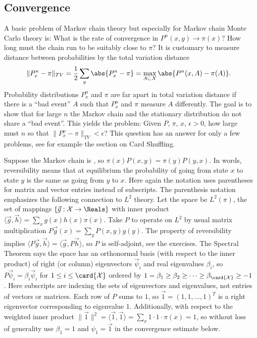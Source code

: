 \documentclass[12pt]{article}
\begin{document}
\subsection*{Convergence} A basic problem of Markov chain theory but
especially for Markov chain Monte Carlo theory is:  What is the rate of
convergence in \( P^n(x,y) \to \pi(x) \)?  How long must the chain run
to be suitably close to \( \pi \)?  It is customary to measure distance
between probabilities by the total variation distance
\[
    \|P^n_x - \pi\|_{TV} = \frac{1}{2} \sum\limits_y \abs{ P^n_x - \pi }
    = \max_{A\subset X} \abs{ P^n(x,A) - \pi(A) }.
\] Probability distributions \( P^n_{x} \) and \( \pi \) are far apart
in total variation distance if there is a ``bad event'' \( A \) such
that \( P^n_{x} \) and \( \pi \) measure \( A \) differently.  The goal
is to show that for large \( n \) the Markov chain and the stationary
distribution do not share a ``bad event''.  This yields the problem:
Given \( P \), \( \pi \), \( x \), \( \epsilon > 0 \), how large must \(
n \) so that \( \| P^n_x - \pi \|_{TV} < \epsilon \)?  This question has
an answer for only a few problems, see for example the section on Card
Shuffling.

Suppose the Markov chain is , so \( \pi(x) P(x,y) = \pi
(y) P(y,x) \).%
In words, reversibility means that at equilibrium the probability of
going from state \( x \) to state \( y \) is the same as going from \( y
\) to \( x \).  Here again the notation uses parentheses for matrix and
vector entries instead of subscripts.  The parenthesis notation
emphasizes the following connection to \( L^2 \) theory.  Let the space
be \( L^2(\pi) \), the set of mappings \( \{\vec{g} :  \mathcal{X} \to
\Reals \} \) with inner product \( \langle \vec{g},\vec{h} \rangle =
\sum_{x}g(x) h(x) \pi(x) \).  Take \( P \) to operate on \( L^2 \) by
usual matrix multiplication \( P\vec{g}(x) = \sum_y P(x,y) g(y) \).  The
property of reversibility implies \( \langle P\vec{g},\vec{h} \rangle =
\langle \vec{g},P \vec{h} \rangle \), so \( P \) is self-adjoint, see
the exercises.  The Spectral Theorem says the space has an orthonormal
basis (with respect to the inner product) of right (or column)
eigenvectors \( \vec{\psi}_i \) and real eigenvalues \( \beta_i \), so \(
P\vec{\psi}_i = \beta_i \vec{\psi}_i \) for \( 1 \le i \le \card{\mathcal
{X}} \) ordered by \( 1 = \beta_1 \ge \beta_2 \ge \cdots \ge \beta_{\card
{\mathcal{X}}} \ge -1 \).  Here subscripts are indexing the sets of
eigenvectors and eigenvalues, not entries of vectors or matrices.  Each
row of \( P \) sums to \( 1 \), so \( \vec{1} = (1,1, \dots, 1)^T \) is
a right eigenvector corresponding to eigenvalue \( 1 \).  Additionally,
with respect to the weighted inner product \( \| \vec{1} \|^{2} =
\langle \vec{1}, \vec{1} \rangle = \sum_{x} 1 \cdot 1 \cdot \pi(x) = 1 \),
so without loss of generality use \( \beta_1 = 1 \) and \( \psi_1 = \vec
{1} \) in the convergence estimate below.
\end{document}
